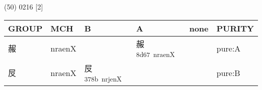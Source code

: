 \documentclass[14pt,a4paper]{scrartcl}
\begin{document}
(50) 0216 {[}2{]}

\begin{longtable}[c]{@{}llllll@{}}
\toprule
\begin{minipage}[b]{0.14\columnwidth}\raggedright\strut
GROUP
\strut\end{minipage} &
\begin{minipage}[b]{0.14\columnwidth}\raggedright\strut
MCH
\strut\end{minipage} &
\begin{minipage}[b]{0.14\columnwidth}\raggedright\strut
B
\strut\end{minipage} &
\begin{minipage}[b]{0.14\columnwidth}\raggedright\strut
A
\strut\end{minipage} &
\begin{minipage}[b]{0.14\columnwidth}\raggedright\strut
none
\strut\end{minipage} &
\begin{minipage}[b]{0.14\columnwidth}\raggedright\strut
PURITY
\strut\end{minipage}\tabularnewline
\midrule
\endhead
\begin{minipage}[t]{0.14\columnwidth}\raggedright\strut
赧
\strut\end{minipage} &
\begin{minipage}[t]{0.14\columnwidth}\raggedright\strut
nraenX
\strut\end{minipage} &
\begin{minipage}[t]{0.14\columnwidth}\raggedright\strut
\strut\end{minipage} &
\begin{minipage}[t]{0.14\columnwidth}\raggedright\strut
赧\textsuperscript{8d67~nraenX}
\strut\end{minipage} &
\begin{minipage}[t]{0.14\columnwidth}\raggedright\strut
\strut\end{minipage} &
\begin{minipage}[t]{0.14\columnwidth}\raggedright\strut
pure:A
\strut\end{minipage}\tabularnewline
\begin{minipage}[t]{0.14\columnwidth}\raggedright\strut
㞋
\strut\end{minipage} &
\begin{minipage}[t]{0.14\columnwidth}\raggedright\strut
nraenX
\strut\end{minipage} &
\begin{minipage}[t]{0.14\columnwidth}\raggedright\strut
㞋\textsuperscript{378b~nrjenX}
\strut\end{minipage} &
\begin{minipage}[t]{0.14\columnwidth}\raggedright\strut
\strut\end{minipage} &
\begin{minipage}[t]{0.14\columnwidth}\raggedright\strut
\strut\end{minipage} &
\begin{minipage}[t]{0.14\columnwidth}\raggedright\strut
pure:B
\strut\end{minipage}\tabularnewline
\bottomrule
\end{longtable}
\end{document}
